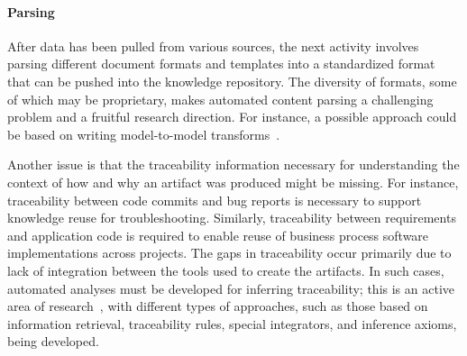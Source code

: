 
\vskip -5pt
\paragraph*{Parsing} After data has been pulled from various
sources, the next activity involves parsing different document formats and
templates into a standardized format that can be pushed into the knowledge
repository. The diversity of formats, some of which may be proprietary, makes
automated content parsing a challenging problem and a fruitful research
direction. For instance, a possible approach could be based on writing
model-to-model transforms~\cite{debdoot:2010:scc}.

Another issue is that the traceability information necessary for understanding
the context of how and why an artifact was produced might be missing. For
instance, traceability between code commits and bug reports is necessary to
support knowledge reuse for troubleshooting. Similarly, traceability between
requirements and application code is required to enable reuse of business
process software implementations across projects. The gaps in traceability occur
primarily due to lack of integration between the tools used to create the
artifacts. In such cases, automated analyses must be developed for inferring
traceability; this is an active area of research~\cite{spanoudakis2005software},
with different types of approaches, such as those based on information
retrieval, traceability rules, special integrators, and inference axioms, being
developed.

